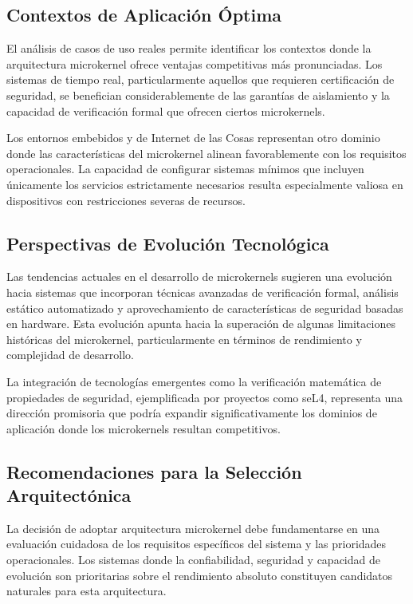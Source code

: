 \documentclass[12pt,a4paper]{article}
\begin{document}
\subsection{Contextos de Aplicación Óptima}

El análisis de casos de uso reales permite identificar los contextos donde la arquitectura microkernel ofrece ventajas competitivas más pronunciadas. Los sistemas de tiempo real, particularmente aquellos que requieren certificación de seguridad, se benefician considerablemente de las garantías de aislamiento y la capacidad de verificación formal que ofrecen ciertos microkernels.

Los entornos embebidos y de Internet de las Cosas representan otro dominio donde las características del microkernel alinean favorablemente con los requisitos operacionales. La capacidad de configurar sistemas mínimos que incluyen únicamente los servicios estrictamente necesarios resulta especialmente valiosa en dispositivos con restricciones severas de recursos.

\subsection{Perspectivas de Evolución Tecnológica}

Las tendencias actuales en el desarrollo de microkernels sugieren una evolución hacia sistemas que incorporan técnicas avanzadas de verificación formal, análisis estático automatizado y aprovechamiento de características de seguridad basadas en hardware. Esta evolución apunta hacia la superación de algunas limitaciones históricas del microkernel, particularmente en términos de rendimiento y complejidad de desarrollo.

La integración de tecnologías emergentes como la verificación matemática de propiedades de seguridad, ejemplificada por proyectos como seL4, representa una dirección promisoria que podría expandir significativamente los dominios de aplicación donde los microkernels resultan competitivos.

\subsection{Recomendaciones para la Selección Arquitectónica}

La decisión de adoptar arquitectura microkernel debe fundamentarse en una evaluación cuidadosa de los requisitos específicos del sistema y las prioridades operacionales. Los sistemas donde la confiabilidad, seguridad y capacidad de evolución son prioritarias sobre el rendimiento absoluto constituyen candidatos naturales para esta arquitectura.
\end{document}
